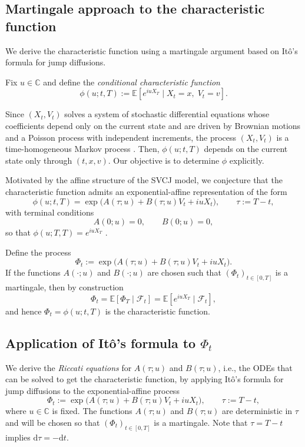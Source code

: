 \documentclass[a4paper,titlepage,12pt]{report}
\theoremstyle{plain}
\begin{document}
\subsection{Martingale approach to the characteristic function}
\label{subsec:martingale_cf}

We derive the characteristic function using a martingale argument based on It\^{o}'s formula for jump diffusions.

Fix $u\in\mathbb{C}$ and define the \emph{conditional characteristic function}
\begin{equation}
\boxed{
\phi(u;t,T)
:=
\mathbb{E}\!\left[e^{iuX_T}\mid X_t=x,\;V_t=v\right].}
\end{equation}

Since $(X_t,V_t)$ solves a system of stochastic differential equations whose coefficients depend only on the current state and are driven by Brownian motions and a Poisson process with independent increments, the process $(X_t,V_t)$ is a time-homogeneous Markov process \citep{OksendalSulem2007}.
Then, $\phi(u;t,T)$ depends on the current state only through
$(t,x,v)$. Our objective is to determine $\phi$ explicitly.

Motivated by the affine structure of the SVCJ model, we conjecture that the characteristic function
admits an exponential-affine representation of the form
\begin{equation}
\phi(u;t,T)
=
\exp\!\big(A(\tau;u)+B(\tau;u)V_t+iuX_t\big),
\qquad
\tau:=T-t,
\label{eq:affine_ansatz}
\end{equation}
with terminal conditions
\[
A(0;u)=0,
\qquad
B(0;u)=0,
\]
so that $\phi(u;T,T)=e^{iuX_T}$ \citep{DuffiePanSingleton2000}.

Define the process
\begin{equation}
\Phi_t
:=
\exp\!\big(A(\tau;u)+B(\tau;u)V_t+iuX_t\big).
\end{equation}
If the functions $A(\cdot;u)$ and $B(\cdot;u)$ are chosen such that $(\Phi_t)_{t\in[0,T]}$ is a
martingale, then by construction
\[
\Phi_t
=
\mathbb{E}\!\left[\Phi_T\mid\mathcal{F}_t\right]
=
\mathbb{E}\!\left[e^{iuX_T}\mid\mathcal{F}_t\right],
\]
and hence $\Phi_t=\phi(u;t,T)$ is the characteristic function.

\subsection{Application of It\^{o}'s formula to $\Phi_t$}
\label{subsec:ito_phi}

We derive the \emph{Riccati equations} for $A(\tau;u)$ and $B(\tau;u)$, i.e., the ODEs that can be solved to get the characteristic function, by applying It\^{o}'s formula for
jump diffusions to the exponential-affine process
\begin{equation}
\Phi_t
:=
\exp\!\big(A(\tau;u)+B(\tau;u)V_t+iuX_t\big),
\qquad \tau:=T-t,
\label{eq:Phi_def}
\end{equation}
where $u\in\mathbb{C}$ is fixed. The functions $A(\tau;u)$ and $B(\tau;u)$ are deterministic in $\tau$
and will be chosen so that $(\Phi_t)_{t\in[0,T]}$ is a martingale. Note that $\tau=T-t$ implies
$\mathrm{d}\tau=-\mathrm{d}t$.
\end{document}
